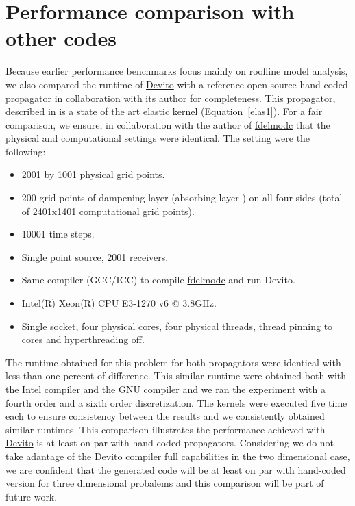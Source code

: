 \documentclass[conference]{IEEEtran}
\begin{document}
\section{Performance comparison with other
codes}\label{performance-comparison-with-other-codes}

Because earlier performance benchmarks focus mainly on roofline model
analysis, we also compared the runtime of
\href{https://github.com/devitocodes/devito}{Devito} with a reference
open source hand-coded propagator in collaboration with its author for
completeness. This propagator, described in \cite{thorbecke} is a
state of the art elastic kernel (Equation~\ref{elas1}). For a fair
comparison, we ensure, in collaboration with the author of
\href{https://github.com/JanThorbecke/OpenSource.git}{fdelmodc} that the
physical and computational settings were identical. The setting were the
following:

\begin{itemize}
\itemsep1pt\parskip0pt
\item
  2001 by 1001 physical grid points.
\item
  200 grid points of dampening layer (absorbing layer \cite{cerjan}) on
  all four sides (total of 2401x1401 computational grid points).
\item
  10001 time steps.
\item
  Single point source, 2001 receivers.
\item
  Same compiler (GCC/ICC) to compile
  \href{https://github.com/JanThorbecke/OpenSource.git}{fdelmodc} and
  run Devito.
\item
  Intel(R) Xeon(R) CPU E3-1270 v6 @ 3.8GHz.
\item
  Single socket, four physical cores, four physical threads, thread
  pinning to cores and hyperthreading off.
\end{itemize}

The runtime obtained for this problem for both propagators were
identical with less than one percent of difference. This similar runtime
were obtained both with the Intel compiler and the GNU compiler and we
ran the experiment with a fourth order and a sixth order discretization.
The kernels were executed five time each to ensure consistency between
the results and we consistently obtained similar runtimes. This
comparison illustrates the performance achieved with
\href{https://github.com/devitocodes/devito}{Devito} is at least on par
with hand-coded propagators. Considering we do not take adantage of the
\href{https://github.com/devitocodes/devito}{Devito} compiler full
capabilities in the two dimensional case, we are confident that the
generated code will be at least on par with hand-coded version for three
dimensional probalems and this comparison will be part of future work.
\end{document}
